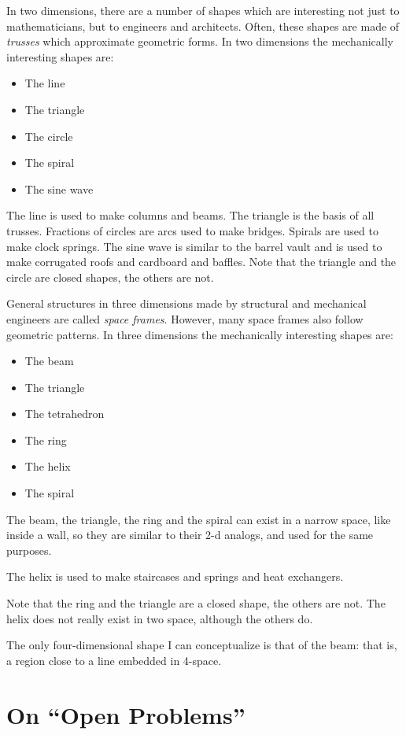 \documentclass[11pt]{article}
\begin{document}
In two dimensions, there are a number of shapes which are interesting not just to mathematicians, but
to engineers and architects. Often, these shapes are made of {\em trusses} which approximate
geometric forms.
In two dimensions the mechanically interesting shapes are:
\begin{itemize}
\item The line
\item The triangle
\item The circle
\item The spiral
\item The sine wave
\end{itemize}

The line is used to make columns and beams. The triangle is the basis of all trusses.
Fractions of circles are arcs used to make bridges. Spirals are used to make clock springs.
The sine wave is similar to the barrel vault and is used to make corrugated roofs and cardboard
and baffles.
Note that the triangle and the circle are closed shapes, the others are not.

General structures in three dimensions made by structural and mechanical engineers are
called {\em space frames}. However, many space frames also follow geometric patterns.
In three dimensions the mechanically interesting shapes are:
\begin{itemize}
\item The beam
\item The triangle
\item The tetrahedron
\item The ring
\item The helix
\item The spiral
\end{itemize}

The beam, the triangle, the ring and the spiral can exist in a narrow space, like inside a wall,
so they are similar to their 2-d analogs, and used for the same purposes.

The helix is used to make staircases and springs and heat exchangers.

Note that the ring and the triangle are a closed shape, the others are not.
The helix does not really exist in two space, although the others do.

The only four-dimensional shape I can conceptualize is that of the
beam: that is, a region close to a line embedded in 4-space.

\section{On ``Open Problems''}
\end{document}

